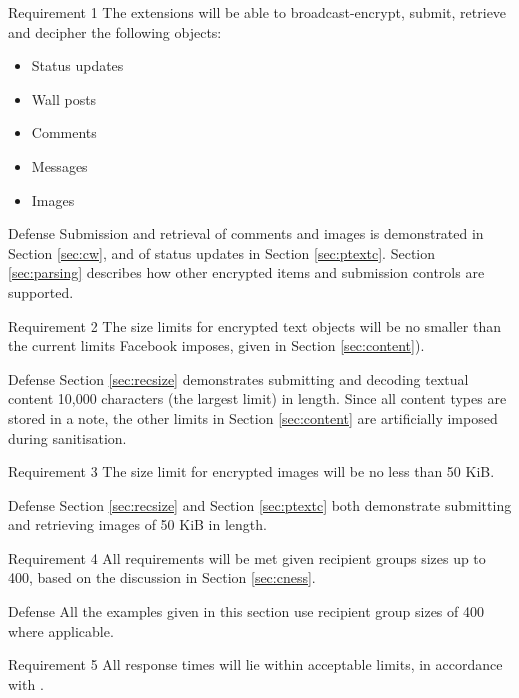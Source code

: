 \begin{desc}

    \item[Requirement 1] The extensions will be able to broadcast-encrypt, submit, retrieve and decipher the following objects:
    
    \begin{itemize}
        \item Status updates
        \item Wall posts
        \item Comments
        \item Messages
        \item Images
    \end{itemize}
    
    \item[Defense] Submission and retrieval of comments and images is demonstrated in Section \ref{sec:cw}, and of status updates in Section \ref{sec:ptextc}. Section \ref{sec:parsing} describes how other encrypted items and submission controls are supported.
    
    \item[Requirement 2] The size limits for encrypted text objects will be no smaller than the current limits Facebook imposes, given in Section \ref{sec:content}).
    
    \item[Defense] Section \ref{sec:recsize} demonstrates submitting and decoding textual content 10,000 characters (the largest limit) in length. Since all content types are stored in a note, the other limits in Section \ref{sec:content} are artificially imposed during sanitisation.

    \item[Requirement 3] The size limit for encrypted images will be no less than 50 KiB.
    
    \item[Defense] Section \ref{sec:recsize} and Section \ref{sec:ptextc} both demonstrate submitting and retrieving images of 50 KiB in length.

    \item[Requirement 4] All requirements will be met given recipient groups sizes up to 400, based on the discussion in Section \ref{sec:cness}.
    
    \item[Defense] All the examples given in this section use recipient group sizes of 400 where applicable.
    
    \item[Requirement 5] All response times will lie within acceptable limits, in accordance with \cite{response}.
    

\end{desc}
